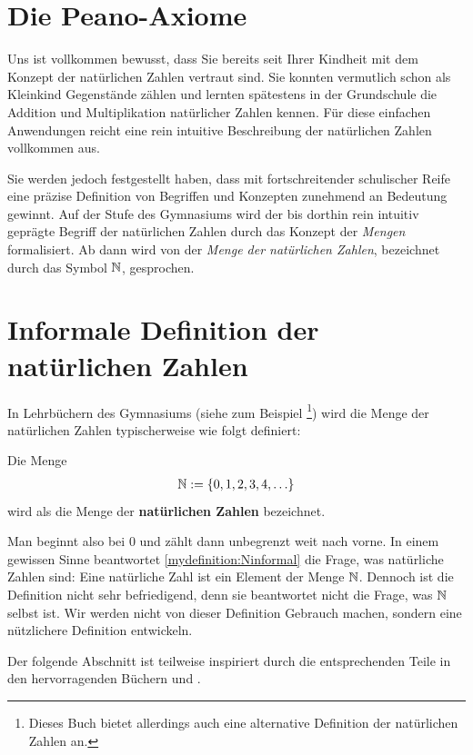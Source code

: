 \section{Die Peano-Axiome}
Uns ist vollkommen bewusst, dass Sie bereits seit Ihrer Kindheit mit dem Konzept der natürlichen Zahlen vertraut sind. Sie konnten vermutlich schon als Kleinkind Gegenstände zählen und lernten spätestens in der Grundschule die Addition und Multiplikation natürlicher Zahlen kennen. Für diese einfachen Anwendungen reicht eine rein intuitive Beschreibung der natürlichen Zahlen vollkommen aus.

Sie werden jedoch festgestellt haben, dass mit fortschreitender schulischer Reife eine präzise Definition von Begriffen und Konzepten zunehmend an Bedeutung gewinnt. Auf der Stufe des Gymnasiums wird der bis dorthin rein intuitiv geprägte Begriff der natürlichen Zahlen durch das Konzept der \textit{Mengen} formalisiert. Ab dann wird von der \textit{Menge der natürlichen Zahlen}, bezeichnet durch das Symbol $\mathbb{N}$, gesprochen.

\section{Informale Definition der natürlichen Zahlen}
In Lehrbüchern des Gymnasiums (siehe zum Beispiel \cite{ArminBarth}\footnote{Dieses Buch bietet allerdings auch eine alternative Definition der natürlichen Zahlen an.}) wird die Menge der natürlichen Zahlen typischerweise wie folgt definiert:
\begin{mydefinition}\label{mydefinition:Ninformal}
Die Menge
\begin{align*}
	\mathbb{N} := \left\{0,1,2,3,4,\ldots\right\}
\end{align*}
wird als die Menge der \textbf{natürlichen Zahlen} bezeichnet.
\end{mydefinition}
Man beginnt also bei $0$ und zählt dann unbegrenzt weit nach vorne. In einem gewissen Sinne beantwortet \cref{mydefinition:Ninformal} die Frage, was natürliche Zahlen sind: Eine natürliche Zahl ist ein Element der Menge $\mathbb{N}$. Dennoch ist die Definition nicht sehr befriedigend, denn sie beantwortet nicht die Frage, was $\mathbb{N}$ selbst ist. \cite{TerenceTao} Wir werden nicht von dieser Definition Gebrauch machen, sondern eine nützlichere Definition entwickeln.

Der folgende Abschnitt ist teilweise inspiriert durch die entsprechenden Teile in den hervorragenden Büchern \cite{TerenceTao} und \cite{AmannEscher1}.

